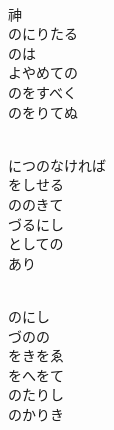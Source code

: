 \documentclass[10pt,b5j]{tarticle} %
\begin{document}
\vspace{1.5em} %
\newcommand{\linespace}{0.5em} %
\newcommand{\blocksize}{0.5\hsize} %
\newcommand{\itemmargin}{6em} %
\begin{enumerate} %
    \setlength{\itemindent}{\itemmargin} %
    \begin{minipage}[c]{\blocksize}
    
        \vspace{\linespace}
        \item~\\
        神\\
        のにりたる\\
        のは\\
        よやめての\\
        のをすべく\\
        のをりてぬ
        
        \vspace{\linespace}
        \item~\\
        につのなければ\\
        をしせる\\
        ののきて\\
        づるにし\\
        としての\\
        あり
        
        \vspace{\linespace}
        \item~\\
        のにし\\
        づのの\\
        をきをゑ\\
        をへをて\\
        のたりし\\
        のかりき
        

\end{minipage}
\end{enumerate}
\end{document}
